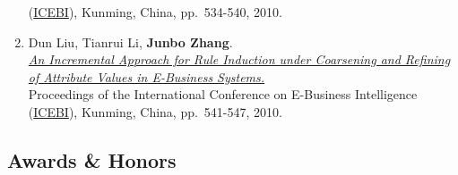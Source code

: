 \documentclass[]{article}
\begin{document}
\begin{enumerate}
  (\href{http://cnais.sem.tsinghua.edu.cn/icebi2010}{ICEBI}), Kunming,
  China, pp.~534-540, 2010.
\item
  Dun Liu, Tianrui Li, \textbf{Junbo Zhang}.\\
  \href{http://www.atlantis-press.com/php/paper-details.php?id=2070}{\emph{An
  Incremental Approach for Rule Induction under Coarsening and Refining
  of Attribute Values in E-Business Systems.}}\\ Proceedings of the
  International Conference on E-Business Intelligence
  (\href{http://cnais.sem.tsinghua.edu.cn/icebi2010}{ICEBI}), Kunming,
  China, pp.~541-547, 2010.
\end{enumerate}

\subsection{Awards \& Honors}\label{awards-honors}
\end{document}
